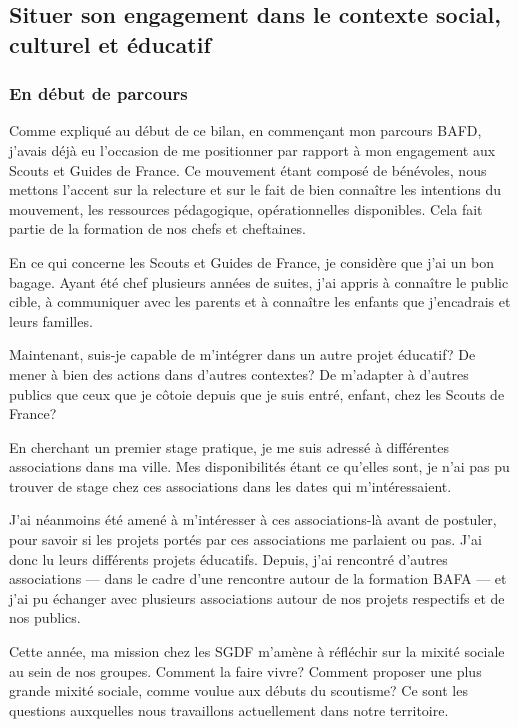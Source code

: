 \documentclass[titlepage,11pt,a4paper]{article}
\begin{document}
\subsection{Situer son engagement dans le contexte social, culturel et éducatif}
\subsubsection{En début de parcours}

Comme expliqué au début de ce bilan, en commençant mon parcours BAFD, j'avais déjà eu
l'occasion de me positionner par rapport à mon engagement aux Scouts et Guides de France.
Ce mouvement étant composé de bénévoles, nous mettons l'accent sur la relecture et sur le
fait de bien connaître les intentions du mouvement, les ressources pédagogique,
opérationnelles disponibles. Cela fait partie de la formation de nos chefs et cheftaines.

En ce qui concerne les Scouts et Guides de France, je considère que j'ai un bon bagage.
Ayant été chef plusieurs années de suites, j'ai appris à connaître le public cible, à
communiquer avec les parents et à connaître les enfants que j'encadrais et leurs familles.

Maintenant, suis-je capable de m'intégrer dans un autre projet éducatif? De mener à bien
des actions dans d'autres contextes? De m'adapter à d'autres publics que ceux que je
côtoie depuis que je suis entré, enfant, chez les Scouts de France?

En cherchant un premier stage pratique, je me suis
adressé à différentes associations dans ma ville. Mes disponibilités étant ce qu'elles
sont, je n'ai pas pu trouver de stage chez ces associations dans les dates qui m'intéressaient.

J'ai néanmoins été amené à m'intéresser à ces associations-là avant de postuler, pour
savoir si les projets portés par ces associations me parlaient ou pas. J'ai donc lu leurs
différents projets éducatifs. Depuis, j'ai rencontré d'autres associations --- dans le cadre
d'une rencontre autour de la formation BAFA --- et j'ai pu échanger avec plusieurs
associations autour de nos projets respectifs et de nos publics.

Cette année, ma mission chez les SGDF m'amène à réfléchir sur la mixité sociale au sein de
nos groupes. Comment la faire vivre? Comment proposer une plus grande mixité sociale,
comme voulue aux débuts du scoutisme? Ce sont les questions auxquelles nous travaillons
actuellement dans notre territoire.
\end{document}
